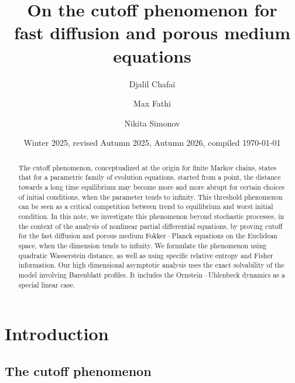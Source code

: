 \documentclass[10pt,reqno]{amsart}
\title[On the cutoff phenomenon for fast diffusion and porous medium equations]{On the cutoff phenomenon for\\fast diffusion and porous medium equations}
\date{Winter 2025, revised Autumn 2025, Autumn 2026, compiled \today}%
\author{Djalil Chafaï}%
\author{Max Fathi}%
\author{Nikita Simonov}%
\numberwithin{equation}{section}
\begin{document}
\begin{abstract}
  The cutoff phenomenon, conceptualized at the origin for finite Markov
  chains, states that for a parametric family of evolution equations, started
  from a point, the distance towards a long time equilibrium may become more
  and more abrupt for certain choices of initial conditions, when the
  parameter tends to infinity. This threshold phenomenon can be seen as a
  critical competition between trend to equilibrium and worst initial
  condition. In this note, we investigate this phenomenon beyond stochastic
  processes, in the context of the analysis of nonlinear partial differential
  equations, by proving cutoff for the fast diffusion and porous medium
  Fokker\,--\,Planck equations on the Euclidean space, when the dimension
  tends to infinity. We formulate the phenomenon using quadratic Wasserstein
  distance, as well as using specific relative entropy and Fisher information.
  Our high dimensional asymptotic analysis uses the exact solvability of the
  model involving Barenblatt profiles. It includes the Ornstein\,--\,Uhlenbeck
  dynamics as a special linear case.
\end{abstract}



\maketitle

{\footnotesize\tableofcontents}

\section{Introduction}

\subsection{The cutoff phenomenon}
\end{document}
